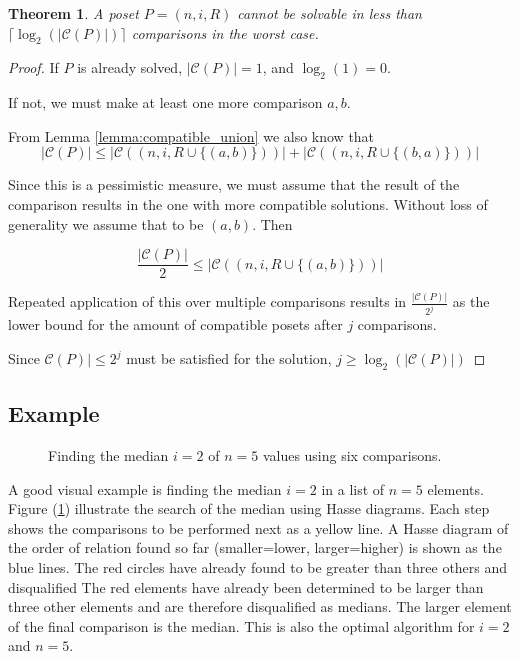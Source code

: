 \documentclass[10pt,journal,compsoc]{IEEEtran}
\newtheorem{theorem}{Theorem}
\begin{document}
\begin{theorem}
  A poset $P=(n,i,R)$ cannot be solvable in less than $\lceil\log_2(|\mathcal{C}(P)|)\rceil$ comparisons in the worst case.
\end{theorem}
\begin{proof}
  If $P$ is already solved, $|\mathcal{C}(P)|=1$, and $\log_2(1)=0$.

  If not, we must make at least one more comparison $a, b$.

  From Lemma \ref{lemma:compatible_union} we also know that
  $$|\mathcal{C}(P)| \leq |\mathcal{C}((n,i,R\cup \{(a, b)\}))| + |\mathcal{C}((n,i,R\cup \{(b, a)\}))|$$

  Since this is a pessimistic measure, we must assume that the result of the comparison
  results in the one with more compatible solutions. Without loss
  of generality we assume that to be $(a, b)$. Then

  $$\frac{|\mathcal{C}(P)|}{2}\leq |\mathcal{C}((n,i,R\cup \{(a, b)\}))|$$

  Repeated application of this over multiple comparisons results in
  $\frac{|\mathcal{C}(P)|}{2^j}$
  as the lower bound for the amount of compatible posets
  after $j$ comparisons.

  Since $\mathcal{C}(P)|\leq 2^j$ must be satisfied for the solution, $j\geq\log_2(|\mathcal{C}(P)|)$
\end{proof}


\subsection{Example}
\begin{figure}[h!]
  \centering
  
  \caption{Finding the median $i=2$ of $n=5$ values using six comparisons.}
  \label{fig:median_of_5}
\end{figure}
A good visual example is finding the median $i=2$ in a list of $n=5$ elements. Figure
(\ref{fig:median_of_5}) illustrate the search of the median using Hasse diagrams. Each step shows
the comparisons to be performed next as a yellow line. A Hasse diagram of the order of relation
found so far (smaller=lower, larger=higher) is shown as the blue lines. The red circles have already
found to be greater than three others and disqualified The red elements have already been determined
to be larger than three other elements and are therefore disqualified as medians. The larger
element of the final comparison is the median. This is also the optimal algorithm for $i=2$ and
$n=5$.
\end{document}
